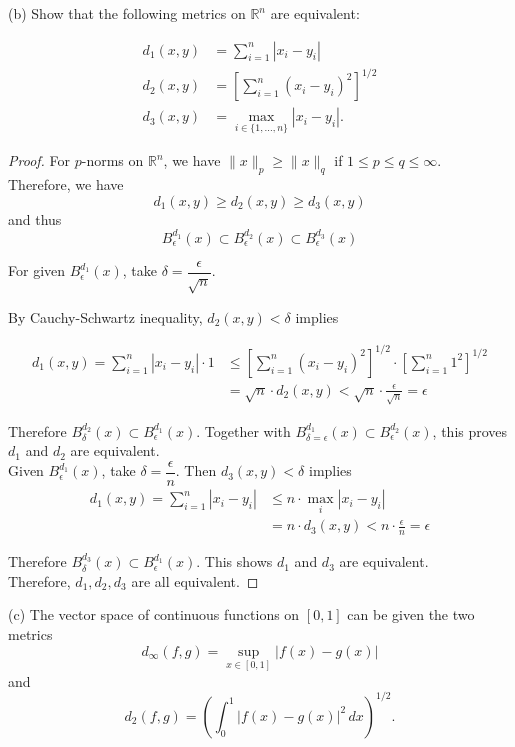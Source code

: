 \documentclass[11pt,a4paper]{amsart}
\def\R{{\mathbb R}}
\def\d{\delta}
\def\e{\epsilon}
\begin{document}
\medskip

(b) Show that the following metrics on $\R^n$ are equivalent:

\begin{align*}
d_1(x,y) &= \sum_{i=1}^n |x_i-y_i| \\
d_2(x,y) &= \left[\sum_{i=1}^n (x_i-y_i)^2\right]^{1/2} \\
d_3(x,y) &= \max_{i\in\{1,\dots,n\}} |x_i-y_i|.
\end{align*}


\begin{proof}
For $p$-norms on $\R^n$, we have $\|x\|_p \ge \|x\|_q$ if $1 \le p \le q \le \infty$.\\

Therefore, we have
$$ d_1(x,y) \ge d_2(x,y) \ge d_3(x,y)$$
and thus
$$B_{\e}^{d_1}(x) \subset B_{\e}^{d_2}(x) \subset B_{\e}^{d_3}(x)$$

For given $B_{\e}^{d_1}(x)$, take $\d = \dfrac{\e}{\sqrt{n}}$.

By Cauchy-Schwartz inequality, $d_2(x,y) < \d$ implies

\begin{align*}
    d_1(x,y) = \sum_{i=1}^n |x_i-y_i|\cdot 1
      &\le \left[\sum_{i=1}^n (x_i-y_i)^2\right]^{1/2} \cdot
            \left[\sum_{i=1}^{n}1^2\right]^{1/2} \\
      &= \sqrt{n}\cdot d_2(x,y) < \sqrt{n} \cdot \frac{\e}{\sqrt{n}} = \e
\end{align*}

Therefore $B_\d^{d_2}(x) \subset B_\e^{d_1}(x)$.
Together with $B_{\d=\e}^{d_1}(x) \subset B_{\e}^{d_2}(x)$, this proves
$d_1$ and $d_2$ are equivalent. \\

Given $B_{\e}^{d_1}(x)$, take $\d = \dfrac{\e}{n}$. Then $d_3(x,y)<\delta$ implies
\begin{align*}
    d_1(x,y) = \sum_{i=1}^n |x_i-y_i|
             &\le n \cdot \max_{i} |x_i-y_i| \\
             &= n\cdot d_3(x,y) < n \cdot \frac{\e}{n} = \e
\end{align*}

Therefore $B_\d^{d_3}(x) \subset B_\e^{d_1}(x)$. This shows
$d_1$ and $d_3$ are equivalent. \\

Therefore, $d_1, d_2, d_3$ are all equivalent.
\end{proof}
\medskip

(c) The vector space of continuous functions on $[0,1]$ can be given the two metrics
$$ d_\infty(f,g) = \sup_{x\in[0,1]} |f(x)-g(x)| $$
and
$$ d_2(f,g) = \left( \int_0^1 |f(x)-g(x)|^2\, dx\right)^{1/2}. $$
\end{document}
